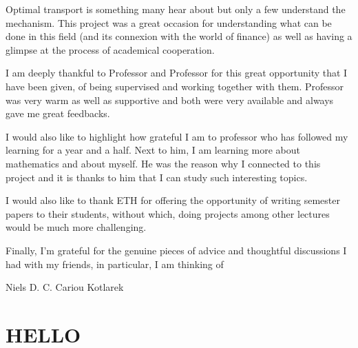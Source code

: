 \documentclass[11pt]{book}
\begin{document}
\frontmatter
\pagestyle{front}
\newpage
{}

\thispagestyle{empty}%


\begin{acknowledgements}

    Optimal transport is something many hear about but only a few understand the mechanism.
    This project was a great occasion for understanding what can be done in this field
    (and its connexion with the world of finance) as well as having a glimpse at the process of academical cooperation.

    I am deeply thankful to Professor and Professor for this great opportunity
    that I have been given, of being supervised and working together with them.
    Professor was very warm as well as supportive and
    both were very available and always gave me great feedbacks.

    I would also like to highlight how grateful I am to professor
    who has followed my learning for a year and a half. Next to him, I am learning more about mathematics and about myself.
    He was the reason why I connected to this project and it is thanks to him that I can study such interesting topics.

    I would also like to thank ETH for offering the opportunity of writing semester papers to their students,
    without which, doing projects among other lectures would be much more challenging.

    Finally, I’m grateful for the genuine pieces of advice and thoughtful discussions
    I had with my friends, in particular, I am thinking of

    Niels D. C. Cariou Kotlarek
\end{acknowledgements}

\begin{explain_abstract}

\end{explain_abstract}





\mainmatter
\pagestyle{main}



\chapter{HELLO}
\end{document}
